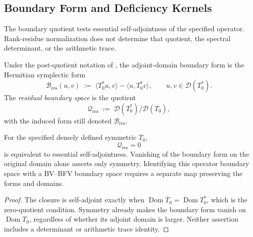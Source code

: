 \subsection{Boundary Form and Deficiency Kernels}
\label{v4-arith:w9-r4:pdnf:what-remains}

The boundary quotient tests essential self-adjointness of the
specified operator. Rank-residue normalization does not determine
that quotient, the spectral determinant, or the arithmetic trace.

\begin{definition}
\label{v4-arith:w9-r4:def:residual-boundary-form}
\ClaimStatusDefinitional Under the post-quotient notation of
, the adjoint-domain
boundary form is the Hermitian symplectic form
\begin{equation}
\label{v4-arith:w9-r4:eq:boundary-form}
\mathcal{B}_{\mathrm{res}}(u,v)
\;:=\;
\langle T_{0}^{*}u,v\rangle-\langle u,T_{0}^{*}v\rangle,
\qquad
u,v\in\mathcal{D}(T_{0}^{*}).
\end{equation}
The \emph{residual boundary space} is the quotient
\begin{equation}
\label{v4-arith:w9-r4:eq:boundary-space}
\mathcal{Q}_{\mathrm{res}}
\;:=\;
\mathcal{D}(T_{0}^{*})/\mathcal{D}(\overline{T_{0}}),
\end{equation}
with the induced form still denoted \(\mathcal{B}_{\mathrm{res}}\).
\end{definition}

\begin{proposition}
\label{v4-arith:w9-r4:prop:polyakov-boundary-target}
For the specified densely defined symmetric \(T_0\),
\begin{equation}
\label{v4-arith:w9-r4:eq:polyakov-boundary-target}
 \mathcal Q_{\mathrm{res}}=0
\end{equation}
is equivalent to essential self-adjointness.
Vanishing of the boundary form on the original domain alone
asserts only symmetry. Identifying this operator boundary space
with a BV--BFV boundary space requires a separate map preserving
the forms and domains.
\end{proposition}
\begin{proof}
The closure is self-adjoint exactly when
\(\operatorname{Dom}\overline T_0=\operatorname{Dom}T_0^*\),
which is the zero-quotient condition. Symmetry already makes the
boundary form vanish on \(\operatorname{Dom}T_0\), regardless
of whether its adjoint domain is larger. Neither assertion
includes a determinant or arithmetic trace identity.
\end{proof}

